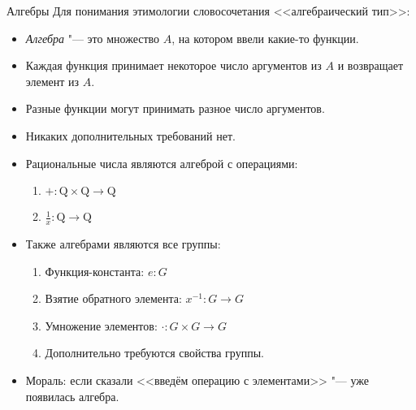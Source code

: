 \begin{frame}{Алгебры}
	Для понимания этимологии словосочетания <<алгебраический тип>>:
	\begin{itemize}
		\item \textit{Алгебра} "--- это множество $A$, на котором ввели какие-то функции.
		\item Каждая функция принимает некоторое число аргументов из $A$ и возвращает элемент из $A$.
		\item Разные функции могут принимать разное число аргументов.
		\item Никаких дополнительных требований нет.
		\item Рациональные числа являются алгеброй с операциями:
			\begin{enumerate}
				\item $+ \colon \mathrm{Q} \times \mathrm{Q} \to \mathrm{Q}$
				\item $\frac{1}{x} \colon \mathrm{Q} \to \mathrm{Q}$
			\end{enumerate}
		\item Также алгебрами являются все группы:
			\begin{enumerate}
				\item Функция-константа: $e \colon G$
				\item Взятие обратного элемента: $x^{-1} \colon G \to G$
				\item Умножение элементов: $\cdot \colon G \times G \to G$
				\item Дополнительно требуются свойства группы.
			\end{enumerate}
		\item Мораль: если сказали <<введём операцию с элементами>> "--- уже появилась алгебра.
	\end{itemize}
\end{frame}

